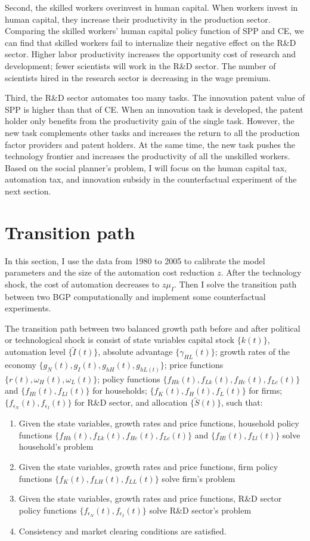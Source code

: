 \documentclass[12pt]{article}
\begin{document}
Second, the skilled workers overinvest in human capital. When workers invest in human capital, they increase their productivity in the production sector. Comparing the skilled workers' human capital policy function of SPP and CE, we can find that skilled workers fail to internalize their negative effect on the R\&D sector. Higher labor productivity increases the opportunity cost of research and development; fewer scientists will work in the R\&D sector. The number of scientists hired in the research sector is decreasing in the wage premium.

Third, the R\&D sector automates too many tasks. The innovation patent value of SPP is higher than that of CE. When an innovation task is developed, the patent holder only benefits from the productivity gain of the single task. However, the new task complements other tasks and increases the return to all the production factor providers and patent holders. At the same time, the new task pushes the technology frontier and increases the productivity of all the unskilled workers. Based on the social planner's problem, I will focus on the human capital tax, automation tax, and innovation subsidy in the counterfactual experiment of the next section.

\section{Transition path}
In this section, I use the data from 1980 to 2005 to calibrate the model parameters and the size of the automation cost reduction $z$. After the technology shock, the cost of automation decreases to $z\mu_I$. Then I solve the transition path between two BGP computationally and implement some counterfactual experiments. 

The transition path between two balanced growth path before and after political or technological shock is consist of state variables capital stock $\{k(t)\}$, automation level $\{\tilde{I}(t)\}$, absolute advantage $\{\gamma_{HL}(t)\}$; growth rates of the economy $\{g_N(t), g_I(t), g_{hH}(t),g_{hL(t)}\}$; price functions $\{r(t), \omega_H(t), \omega_L(t)\}$; policy functions $\{f_{Hk}(t), f_{Lk}(t), f_{Hc}(t), f_{Lc}(t)\}$ and $\{f_{Hl}(t), f_{Ll}(t)\}$ for households; $\{f_{K}(t), f_{H}(t), f_{L}(t)\}$ for firms; $\{f_{\epsilon_N}(t), f_{\epsilon_I}(t)\}$ for R\&D sector, and allocation $\{\tilde{S}(t)\}$, such that: 
\begin{enumerate}
\item Given the state variables, growth rates and price functions, household policy functions  $\{f_{Hk}(t), f_{Lk}(t), f_{Hc}(t), f_{Lc}(t)\}$ and $\{f_{Hl}(t), f_{Ll}(t)\}$ solve household's problem
\item Given the state variables, growth rates and price functions, firm policy functions $\{f_{K}(t), f_{LH}(t), f_{LL}(t)\}$ solve firm's problem
\item Given the state variables, growth rates and price functions, R\&D sector policy functions $\{f_{\epsilon_N}(t), f_{\epsilon_I}(t)\}$ solve  R\&D sector's problem
\item Consistency and market clearing conditions are satisfied. 
\end{enumerate}
\end{document}
